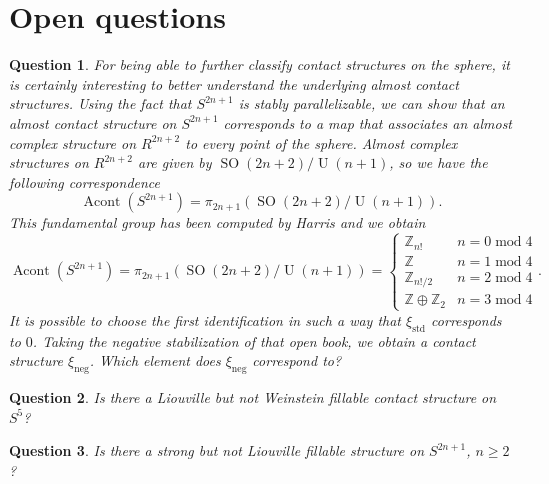 \documentclass{amsart}
\newtheorem{question}{Question}
\begin{document}
\section*{Open questions}
\begin{question}
    For being able to further classify contact structures on the sphere, it is certainly interesting to better understand the underlying almost contact structures.
    Using the fact that $S^{2n+1}$ is stably parallelizable, we can show that an almost contact structure on $S^{2n+1}$ corresponds to a map that associates an almost complex structure on $R^{2n+2}$
    to every point of the sphere.
    Almost complex structures on $R^{2n+2}$ are given by $\operatorname{SO}(2n + 2)/\operatorname{U}(n + 1)$, so we have the following correspondence
    \[
        \operatorname{Acont}\left(S^{2n+1}\right) = \pi_{2n+1}(\operatorname{SO}(2n + 2)/\operatorname{U}(n + 1)).
    \]
    This fundamental group has been computed by Harris \cite{Harris63} and we obtain
    \[
        \operatorname{Acont}\left(S^{2n+1}\right) = \pi_{2n+1}(\operatorname{SO}(2n + 2)/\operatorname{U}(n + 1)) = \begin{cases}
            \mathbb Z_{n!} &n = 0 \operatorname{mod} 4\\
            \mathbb Z &n = 1 \operatorname{mod} 4\\
            \mathbb Z_{n!/2} &n = 2 \operatorname{mod} 4\\
            \mathbb Z \oplus \mathbb Z_2 &n = 3 \operatorname{mod} 4
        \end{cases}.
    \]
    It is possible to choose the first identification in such a way that $\xi_{\mathrm{std}}$ corresponds to $0$.
    Taking the negative stabilization of that open book, we obtain a contact structure $\xi_\mathrm{neg}$. Which element does $\xi_\mathrm{neg}$ correspond to?

\end{question}
\begin{question}    
Is there a Liouville but not Weinstein fillable contact structure on $S^5$? 
\end{question}
\begin{question}
Is there a strong but not Liouville fillable structure on $S^{2n+1}$, $n \ge 2$?
\end{question}
\newpage
\nocite{*}


\end{document}
